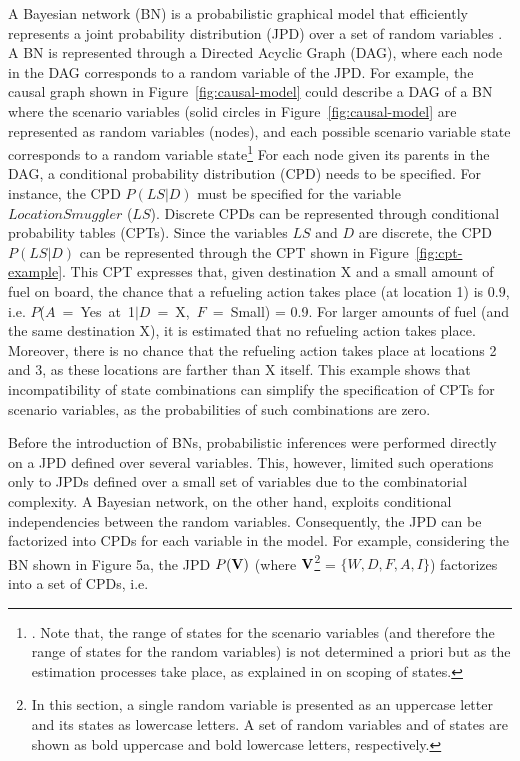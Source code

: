 \documentclass[conference]{IEEEtran}
\begin{document}
A Bayesian network (BN) is a probabilistic graphical model that efficiently represents a joint probability distribution (JPD) over a set of random variables \cite{jensen01book,pearl88book}. A BN is represented through a Directed Acyclic Graph (DAG), where each node in the DAG corresponds to a random variable of the JPD. For example, the causal graph shown in Figure~\ref{fig:causal-model} could describe a DAG of a BN where the scenario variables (solid circles in Figure~\ref{fig:causal-model} are represented as random variables (nodes), and each possible scenario variable state corresponds to a random variable state\footnote{. 
Note that, the range of states for the scenario variables (and therefore the range of states for the random variables) is not determined a priori but as the estimation processes take place, as explained in \cite{conrado14if} on scoping of states.}
For each node given its parents in the DAG, a conditional probability distribution (CPD) needs to be specified. For instance, the CPD $P(LS|D)$ must be specified for the variable $LocationSmuggler$ ($LS$). Discrete CPDs can be represented through conditional probability tables (CPTs).  Since the variables $LS$ and $D$ are discrete, the CPD $P(LS|D)$ can be represented through the CPT shown in Figure~\ref{fig:cpt-example}. This CPT expresses that, given destination X and a small amount of fuel on board, the chance that a refueling action takes place (at location 1) is $0.9$, i.e. $P$($A$~=~Yes~at~1$|$$D$~=~X,~$F$~=~Small) = 0.9. For larger amounts of fuel (and the same destination X), it is estimated that no refueling action takes place. Moreover, there is no chance that the refueling action takes place at locations 2 and 3, as these locations are farther than X itself. This example shows that incompatibility of state combinations can simplify the specification of CPTs for scenario variables, as the probabilities of such combinations are zero.

Before the introduction of BNs, probabilistic inferences were performed directly on a JPD defined over several variables. This, however, limited such operations only to JPDs defined over a small set of variables due to the combinatorial complexity. A Bayesian network, on the other hand, exploits conditional independencies between the random variables. Consequently, the JPD can be factorized into CPDs for each variable in the model. 
For example, considering the BN shown in Figure 5a, the JPD $P({\mathbf{V}})$ (where ${\mathbf{V}}$\footnote{In this section, a single random variable is presented as an uppercase letter and its states as lowercase letters. A set of random variables and of states are shown as bold uppercase and bold lowercase letters, respectively.} = $\{W, D, F, A, I\}$) factorizes into a set of CPDs, i.e.
\end{document}
